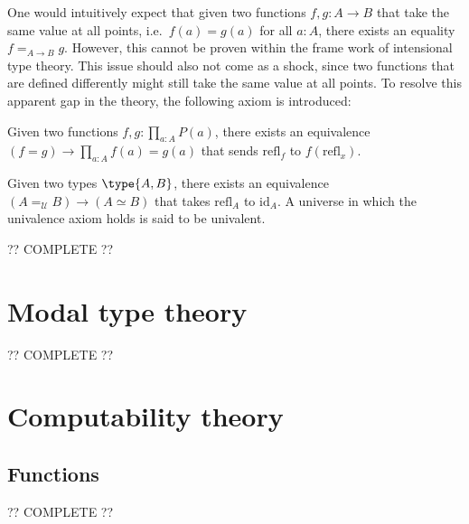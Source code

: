    One would intuitively expect that given two functions $f,g:A\rightarrow B$ that take the same value at all points, i.e.~$f(a)=g(a)$ for all $a:A$, there exists an equality $f=_{A\rightarrow B}g$. However, this cannot be proven within the frame work of intensional type theory. This issue should also not come as a shock, since two functions that are defined differently might still take the same value at all points. To resolve this apparent gap in the theory, the following axiom is introduced:
    \begin{axiom}
        Given two functions $f,g:\prod_{a:A}P(a)$, there exists an equivalence $(f=g)\rightarrow\prod_{a:A}f(a)=g(a)$ that sends $\mathrm{refl}_f$ to $f(\mathrm{refl}_x)$.
    \end{axiom}
    \begin{axiom}
        Given two types $\type{A,B}$, there exists an equivalence $(A=_{\mathcal{U}}B)\rightarrow(A\simeq B)$ that takes $\mathrm{refl}_A$ to $\mathrm{id}_A$. A universe in which the univalence axiom holds is said to be univalent.
    \end{axiom}

    ?? COMPLETE ??

\section{Modal type theory}\label{section:modal_type_theory}

    ?? COMPLETE ??

\section{Computability theory}\label{section:turing}
\subsection{Functions}



    ?? COMPLETE ??